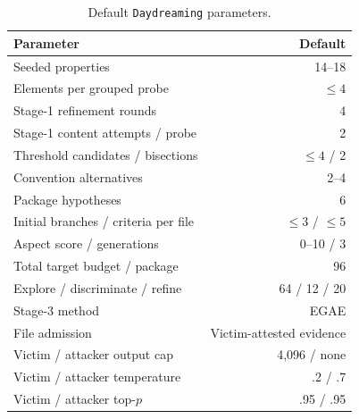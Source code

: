 \documentclass[letterpaper,twocolumn,10pt]{article}
\newcommand{\method}{\texttt{Daydreaming}\xspace}
\begin{document}
\raggedbottom

\newpage

\appendix
\begin{table}[!t]
  \label{app:evaluation-details}
  \vspace{8pt}

  \begin{minipage}[t]{0.48\textwidth}
    \centering
    \scriptsize
    \caption{Default \method parameters.}
    \label{tab:daydreaming-defaults}
    \setlength{\tabcolsep}{4pt}
    \begin{tabularx}{\linewidth}{@{}Yr@{}}
      \toprule
      Parameter & Default\\
      \midrule
      Seeded properties & 14--18\\
      Elements per grouped probe & $\leq4$\\
      Stage-1 refinement rounds & 4\\
      Stage-1 content attempts / probe & 2\\
      Threshold candidates / bisections & $\leq4$ / 2\\
      Convention alternatives & 2--4\\
      Package hypotheses & 6\\
      Initial branches / criteria per file & $\leq3$ / $\leq5$\\
      Aspect score / generations & 0--10 / 3\\
      Total target budget / package & 96\\
      Explore / discriminate / refine & 64 / 12 / 20\\
      Stage-3 method & EGAE\\
      File admission & Victim-attested evidence\\
      Victim / attacker output cap & 4,096 / none\\
      Victim / attacker temperature & .2 / .7\\
      Victim / attacker top-$p$ & .95 / .95\\
      \bottomrule
    \end{tabularx}
\end{minipage}%

\end{table}
\end{document}
